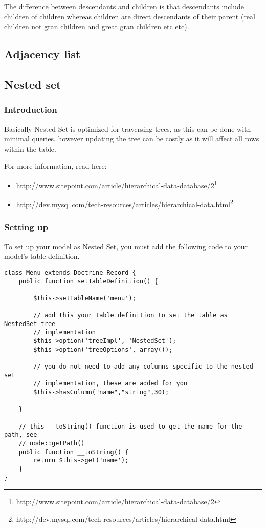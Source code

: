 \documentclass[11pt,a4paper]{report}
\begin{document}
The difference between descendants and children is that descendants include children of children whereas children are direct descendants of their parent (real children not gran children and great gran children etc etc).

\subsection{Adjacency list}
\subsection{Nested set}
\subsubsection{Introduction}
Basically Nested Set is optimized for traversing trees, as this can be done with minimal queries, however updating the tree can be costly as it will affect all rows within the table.

For more information, read here:

\begin{itemize}
\item{http://www.sitepoint.com/article/hierarchical-data-database/2\footnote{http://www.sitepoint.com/article/hierarchical-data-database/2}}
\item{http://dev.mysql.com/tech-resources/articles/hierarchical-data.html\footnote{http://dev.mysql.com/tech-resources/articles/hierarchical-data.html}}
\end{itemize}
\subsubsection{Setting up}
To set up your model as Nested Set, you must add the following code to your model's table definition.

\begin{verbatim}
class Menu extends Doctrine_Record {
    public function setTableDefinition() {

        $this->setTableName('menu');

        // add this your table definition to set the table as NestedSet tree
        // implementation
        $this->option('treeImpl', 'NestedSet');
        $this->option('treeOptions', array());

        // you do not need to add any columns specific to the nested set
        // implementation, these are added for you
        $this->hasColumn("name","string",30);

    }

    // this __toString() function is used to get the name for the path, see
    // node::getPath()
    public function __toString() {
        return $this->get('name');
    }
}
\end{verbatim}
\end{document}
